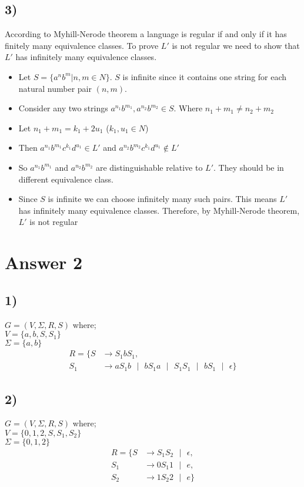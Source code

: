 \documentclass[12pt]{article}
\begin{document}
\subsection*{3)} 
According to Myhill-Nerode theorem a language is regular if and only if it has finitely many equivalence classes. To prove $L'$ is not regular we need to show that $L'$ has infinitely many equivalence classes.
\begin{itemize}
    \item Let $S = \{a^nb^m | n,m \in N\}$. $S$ is infinite since it contains one string for each natural number pair $(n,m)$.
    \item Consider any two strings $a^{n_1}b^{m_1} , a^{n_2}b^{m_2} \in S $. Where $n_1 + m_1 \neq n_2 + m_2$
    \item Let $n_1 + m_1 = k_1 + 2u_1$ ($k_1, u_1 \in N$)
    \item Then $a^{n_1}b^{m_1}c^{k_1}d^{u_1} \in L'$ and $a^{n_2}b^{m_2}c^{k_1}d^{u_1} \notin L'$
    \item So $a^{n_1}b^{m_1}$ and $a^{n_2}b^{m_2}$ are distinguishable relative to $L'$. They should be in different equivalence class. 
    \item Since $S$ is infinite we can choose infinitely many such pairs. This means $L'$ has infinitely many equivalence classes. Therefore, by Myhill-Nerode theorem, $L'$ is not regular 
\end{itemize}


\section*{Answer 2}
\subsection*{1)} 
$G = (V, \Sigma, R, S)$ where; \\ 
$V = \{a,b,S,S_1\}$ \\ 
$\Sigma = \{a,b\}$
\begin{equation*}
    \begin{split}
        R = \{S &\rightarrow S_1bS_1, \\ 
        S_1 &\rightarrow aS_1b \text{ } | \text{ }  bS_1a \text{ } | \text{ } S_1S_1 \text{ } | \text{ } bS_1 \text{ } | \text{ } \epsilon \}
    \end{split}
\end{equation*}

\subsection*{2)}
$G = (V, \Sigma, R, S)$ where; \\ 
$V = \{0,1,2,S,S_1,S_2\}$ \\ 
$\Sigma = \{0,1,2\}$
\begin{equation*}
    \begin{split}
        R = \{S &\rightarrow S_1 S_2 \text{ } | \text{ } \epsilon, \\ 
        S_1 &\rightarrow 0 S_1 1 \text{ } | \text{ }  e, \\
        S_2 &\rightarrow 1 S_2 2 \text{ } | \text{ }  e \}
    \end{split}
\end{equation*}
\end{document}
